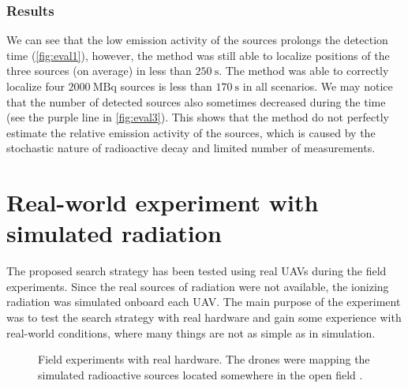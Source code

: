 \subsubsection{Results}
We can see that the low emission activity of the sources prolongs the detection time (\ref{fig:eval1}), however, the method was still able to localize positions of the three sources (on average) in less than $\SI{250}{\second}$.
The method was able to correctly localize four $\SI{2000}{\mega\becquerel}$ sources is less than  $\SI{170}{\second}$ in all scenarios.
We may notice that the number of detected sources also sometimes decreased during the time (see the purple line in \ref{fig:eval3}). 
This shows that the method do not perfectly estimate the relative emission activity of the sources, which is caused by the stochastic nature of radioactive decay and limited number of measurements.





\section{Real-world experiment with simulated radiation\label{chap:exp3}}
The proposed search strategy has been tested using real \ac{UAV}s during the field experiments.
Since the real sources of radiation were not available, the ionizing radiation was simulated onboard each \ac{UAV}.
The main purpose of the experiment was to test the search strategy with real hardware and gain some experience with real-world conditions, where many things are not as simple as in simulation.
\begin{figure}[!htb]
  \centering
  \caption{Field experiments with real hardware. The drones \protect{} were mapping the simulated radioactive sources located somewhere in the open field \protect{}.}
  \label{fig:field}
\end{figure}
